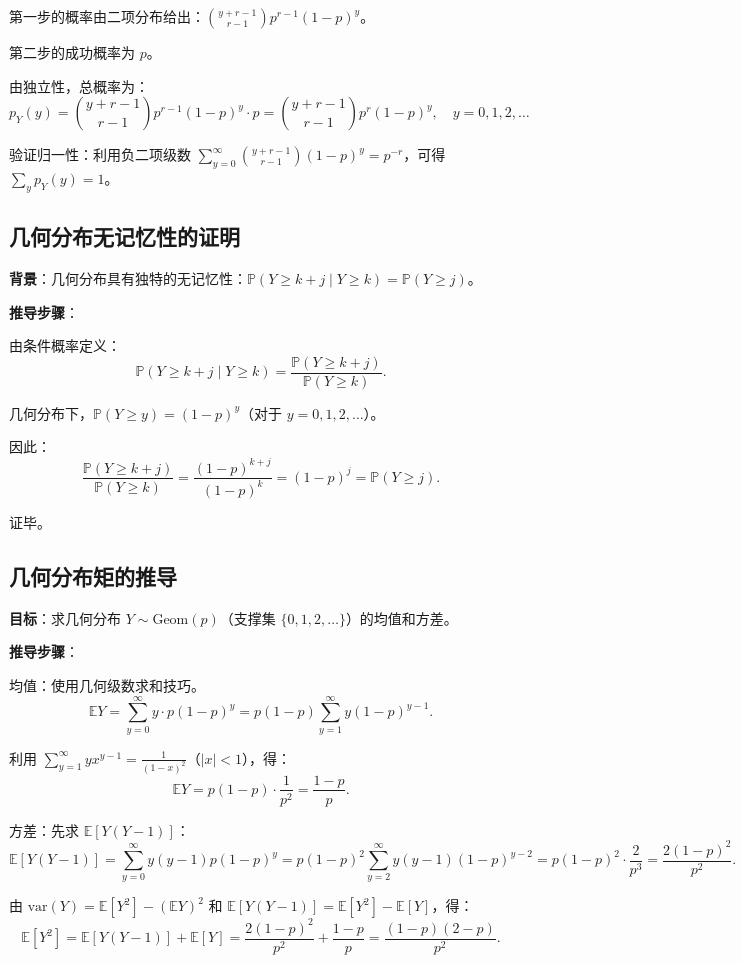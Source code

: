 第一步的概率由二项分布给出：$\binom{y+r-1}{r-1} p^{r-1}(1-p)^{y}$。

第二步的成功概率为 $p$。

由独立性，总概率为：
\[
p_Y(y) = \binom{y+r-1}{r-1} p^{r-1}(1-p)^{y} \cdot p = \binom{y+r-1}{r-1} p^{r}(1-p)^{y}, \quad y = 0, 1, 2, \ldots
\]

验证归一性：利用负二项级数 $\sum_{y=0}^{\infty} \binom{y+r-1}{r-1} (1-p)^{y} = p^{-r}$，可得 $\sum_{y} p_Y(y) = 1$。

\subsection{几何分布无记忆性的证明}\label{sec:derivation-memoryless}

\textbf{背景}：几何分布具有独特的无记忆性：$\mathbb{P}(Y \geq k+j \mid Y \geq k) = \mathbb{P}(Y \geq j)$。

\textbf{推导步骤}：

由条件概率定义：
\[
\mathbb{P}(Y \geq k+j \mid Y \geq k) = \frac{\mathbb{P}(Y \geq k+j)}{\mathbb{P}(Y \geq k)}.
\]

几何分布下，$\mathbb{P}(Y \geq y) = (1-p)^{y}$（对于 $y = 0, 1, 2, \ldots$）。

因此：
\[
\frac{\mathbb{P}(Y \geq k+j)}{\mathbb{P}(Y \geq k)} = \frac{(1-p)^{k+j}}{(1-p)^{k}} = (1-p)^{j} = \mathbb{P}(Y \geq j).
\]

证毕。

\subsection{几何分布矩的推导}\label{sec:derivation-geometric-moments}

\textbf{目标}：求几何分布 $Y \sim \text{Geom}(p)$（支撑集 $\{0,1,2,\ldots\}$）的均值和方差。

\textbf{推导步骤}：

均值：使用几何级数求和技巧。
\[
\mathbb{E}Y = \sum_{y=0}^{\infty} y \cdot p(1-p)^{y} = p(1-p) \sum_{y=1}^{\infty} y (1-p)^{y-1}.
\]

利用 $\sum_{y=1}^{\infty} y x^{y-1} = \frac{1}{(1-x)^{2}}$（$|x| < 1$），得：
\[
\mathbb{E}Y = p(1-p) \cdot \frac{1}{p^{2}} = \frac{1-p}{p}.
\]

方差：先求 $\mathbb{E}[Y(Y-1)]$：
\[
\mathbb{E}[Y(Y-1)] = \sum_{y=0}^{\infty} y(y-1) p(1-p)^{y} = p(1-p)^{2} \sum_{y=2}^{\infty} y(y-1)(1-p)^{y-2} = p(1-p)^{2} \cdot \frac{2}{p^{3}} = \frac{2(1-p)^{2}}{p^{2}}.
\]

由 $\text{var}(Y) = \mathbb{E}[Y^{2}] - (\mathbb{E}Y)^{2}$ 和 $\mathbb{E}[Y(Y-1)] = \mathbb{E}[Y^{2}] - \mathbb{E}[Y]$，得：
\[
\mathbb{E}[Y^{2}] = \mathbb{E}[Y(Y-1)] + \mathbb{E}[Y] = \frac{2(1-p)^{2}}{p^{2}} + \frac{1-p}{p} = \frac{(1-p)(2-p)}{p^{2}}.
\]

